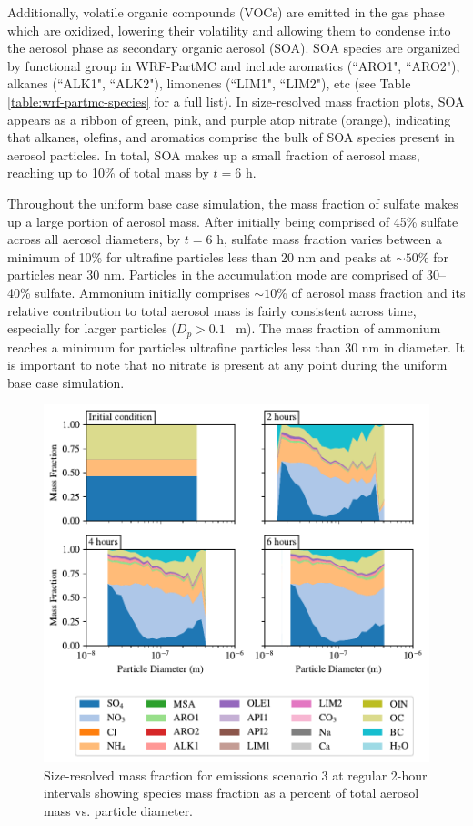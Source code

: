 Additionally, volatile organic compounds (VOCs) are emitted in the gas phase which are oxidized, lowering their volatility and allowing them to condense into the aerosol phase as secondary organic aerosol (SOA). SOA species are organized by functional group in WRF-PartMC and include aromatics (``ARO1", ``ARO2"), alkanes (``ALK1", ``ALK2"), limonenes (``LIM1", ``LIM2"), etc (see Table \ref{table:wrf-partmc-species} for a full list). In size-resolved mass fraction plots, SOA appears as a ribbon of green, pink, and purple atop nitrate (orange), indicating that alkanes, olefins, and aromatics comprise the bulk of SOA species present in aerosol particles. In total, SOA makes up a small fraction of aerosol mass, reaching up to 10\% of total mass by $t=6$ h.

Throughout the uniform base case simulation, the mass fraction of sulfate makes up a large portion of aerosol mass. After initially being comprised of 45\% sulfate across all aerosol diameters, by $t=6$ h, sulfate mass fraction varies between a minimum of 10\% for ultrafine particles less than 20 nm and peaks at $\sim50\%$ for particles near 30 nm. Particles in the accumulation mode are comprised of 30--40\% sulfate. Ammonium initially comprises $\sim10\%$ of aerosol mass fraction and its relative contribution to total aerosol mass is fairly consistent across time, especially for larger particles ($D_p > 0.1$ \si{\mu m}). The mass fraction of ammonium reaches a minimum for particles ultrafine particles less than 30 nm in diameter. It is important to note that no nitrate is present at any point during the uniform base case simulation.

\begin{figure}[!t]
  \centering
    \includegraphics[width=\textwidth]{figures/chapter5/speciated-mass-frac-four-panel-point-source-1x1-z40.pdf}
    \caption{Size-resolved mass fraction for emissions scenario 3 at regular 2-hour intervals showing species mass fraction as a percent of total aerosol mass vs. particle diameter.}
    \label{fig:mass-frac-s3}
\end{figure}

